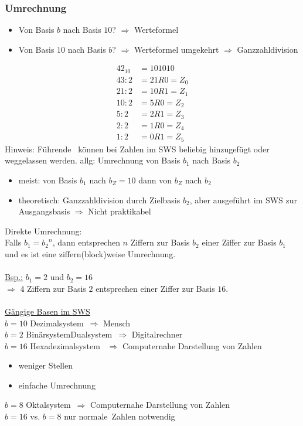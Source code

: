 \documentclass[10pt,a4paper]{scrartcl}
\begin{document}
	\subsubsection*{Umrechnung}
	\begin{itemize}
		\item Von Basis $b$ nach Basis $10$?
		\subitem $\Rightarrow$ Werteformel
		\item Von Basis $10$ nach Basis $ b $?
		\subitem $ \Rightarrow $ Werteformel umgekehrt
		\subitem $ \Rightarrow $ Ganzzahldivision
	\end{itemize}
	\begin{equation}
	\begin{split}
	{42}_{10} &= 101010\\	
	43:2 &= 21R0 = Z_0\\
	21:2 &= 10R1 = Z_1\\
	10:2 &= 5R0 = Z_2\\
	5:2  &= 2R1 = Z_3\\
	2:2  &= 1R0 =Z_4\\
	1:2	&= 0R1 = Z_5
	\end{split}
	\end{equation}
	Hinweis: Führende  \grqq\ können bei Zahlen im \ac{SWS} beliebig hinzugefügt oder weggelassen werden. 
	allg: Umrechnung von Basis $b_1$ nach Basis $b_2$
	\begin{itemize}
		\item meist: von Basis $b_1$ nach $b_Z=10$ dann von $b_Z$ nach $b_2$
		\item theoretisch: Ganzzahldivision durch Zielbasis $b_2$, aber ausgeführt im \ac{SWS} zur Ausgangsbasis $\Rightarrow$ Nicht praktikabel
	\end{itemize}
	Direkte Umrechnung:\\
	Falls $ b_1 = {b_2}^n $, dann entsprechen $n$ Ziffern zur Basis $ b_2 $ einer Ziffer zur Basis $ b_1 $ und es ist eine ziffern(block)weise Umrechnung.\\
	\\
	\underline{Bsp.:} $ b_1=2 $ und $ b_2=16 $\\
	$ \Rightarrow $ 4 Ziffern zur Basis $ 2 $ entsprechen einer Ziffer zur Basis $ 16 $.\\ \\
	
	\underline{Gängige Basen im \ac{SWS}}\\
	$ b=10 $ \glqq Dezimalsystem\grqq\ $ \Rightarrow $ Mensch\\
	$ b=2 $ \glqq Binärsystem\grqq\/\glqq Dualsystem\grqq\ $ \Rightarrow $ Digitalrechner \\
	$ b=16 $ \glqq Hexadezimalsystem \grqq\ $ \Rightarrow $ Computernahe Darstellung von Zahlen
	\begin{itemize}
		\item weniger Stellen
		\item einfache Umrechnung
	\end{itemize}
	$ b=8 $ \glqq Oktalsystem\grqq\ $ \Rightarrow $ Computernahe Darstellung von Zahlen\\
	$ b=16 $ vs. $ b=8 $ nur \glqq normale\grqq\ Zahlen notwendig
	
\end{document}
